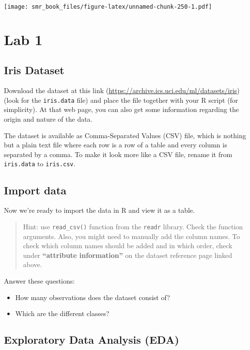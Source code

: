 \documentclass[
  oneside]{book}
\providecommand{\tightlist}{%
  \setlength{\itemsep}{0pt}\setlength{\parskip}{0pt}}
\begin{document}
\texttt{[image: smr\_book\_files/figure-latex/unnamed-chunk-250-1.pdf]}

\hypertarget{lab-1}{%
\chapter{Lab 1}\label{lab-1}}

\hypertarget{iris-dataset}{%
\section{Iris Dataset}\label{iris-dataset}}

Download the dataset at this link (\url{https://archive.ics.uci.edu/ml/datasets/iris})
(look for the \texttt{iris.data} file) and place the file together with your R script (for simplicity).
At that web page, you can also get some information regarding the origin and
nature of the data.

The dataset is available as Comma-Separated Values (CSV) file, which is nothing
but a plain text file where each row is a row of a table and every column is separated
by a comma. To make it look more like a CSV file, rename it from \texttt{iris.data} to \texttt{iris.csv}.

\hypertarget{import-data}{%
\section{Import data}\label{import-data}}

Now we're ready to import the data in R and view it as a table.

\begin{quote}
Hint: use \texttt{read\_csv()} function from the \texttt{readr} library. Check
the function arguments. Also, you might need to manually add the column names.
To check which column names should be added and in which order,
check under \textbf{``attribute information''} on the dataset reference page linked above.
\end{quote}

Answer these questions:

\begin{itemize}
\tightlist
\item
  How many observations does the dataset consist of?
\item
  Which are the different classes?
\end{itemize}

\hypertarget{exploratory-data-analysis-eda}{%
\section{Exploratory Data Analysis (EDA)}\label{exploratory-data-analysis-eda}}
\end{document}
